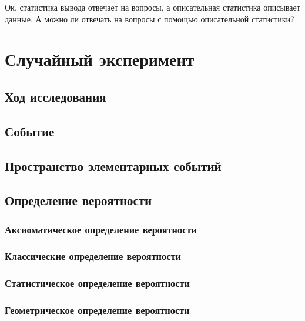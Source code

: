 \documentclass[
  letterpaper,
]{scrbook}
\theoremstyle{definition}
\theoremstyle{remark}
\begin{document}
Ок, статистика вывода отвечает на вопросы, а описательная статистика
описывает данные. А можно ли отвечать на вопросы с помощью описательной
статистики?


\chapter{Случайный эксперимент}\label{stats-rand-exp}

\section{Ход исследования}\label{stats-rand-exp-research}

\section{Событие}\label{stats-rand-exp-event}

\section{Пространство элементарных событий}\label{stats-rand-exp-space}

\section{Определение вероятности}\label{stats-rand-exp-prob-def}

\subsection{Аксиоматическое определение
вероятности}\label{stats-rand-exp-prob-def-axoim}

\subsection{Классические определение
вероятности}\label{stats-rand-exp-prob-def-classic}

\subsection{Статистическое определение
вероятности}\label{stats-rand-exp-prob-def-stats}

\subsection{Геометрическое определение
вероятности}\label{stats-rand-exp-prob-def-geom}
\end{document}
